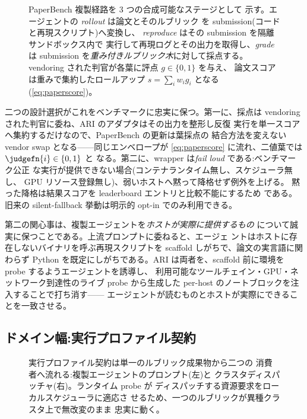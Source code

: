 \begin{figure}[t]
  \centering
  \resizebox{\textwidth}{!}{}
  \caption{PaperBench 複製経路を 3 つの合成可能なステージとして
           示す。エージェントの \emph{rollout} は論文とそのルブリック
           を submission(コードと再現スクリプト)へ変換し、
           \emph{reproduce} はその submission を隔離サンドボックス内で
           実行して再現ログとその出力を取得し、\emph{grade} は
           submission を\emph{重み付きルブリック木}に対して採点する。
           vendoring された判官が各葉に評点 $g\in\{0,1\}$ を与え、
           論文スコアは重みで集約したロールアップ $s=\sum_i w_i g_i$
           となる(\cref{eq:paperscore})。}
  \label{fig:pb-stages}
\end{figure}

二つの設計選択がこれをベンチマークに忠実に保つ。第一に、採点は
vendoring された判官に委ね、ARI のアダプタはその出力を整形し反復
実行を単一スコアへ集約するだけなので、PaperBench の更新は葉採点の
結合方法を変えない vendor swap となる——同じエンベロープが
\cref{eq:paperscore} に流れ、二値葉では $\judgefn{i}\in\{0,1\}$ と
なる。第二に、wrapper は\emph{fail loud} である:ベンチマーク公正
な実行が提供できない場合(コンテナランタイム無し、スケジューラ無し、
GPU リソース登録無し)、弱いホストへ黙って降格せず例外を上げる。
黙った降格は結果スコアを leaderboard エントリと比較不能にするため
である。旧来の silent-fallback 挙動は明示的 opt-in でのみ利用できる。

第二の関心事は、複製エージェントを\emph{ホストが実際に提供するもの}
について誠実に保つことである。上流プロンプトに委ねると、エージェ
ントはホストに存在しないバイナリを呼ぶ再現スクリプトを scaffold
しがちで、論文の実言語に関わらず Python を既定にしがちである。ARI
は両者を、scaffold 前に環境を probe するようエージェントを誘導し、
利用可能なツールチェイン・GPU・ネットワーク到達性のライブ probe
から生成した per-host のノートブロックを注入することで打ち消す——
エージェントが読むものとホストが実際にできることを一致させる。

\subsection{ドメイン幅:実行プロファイル契約}\label{sec:paper:paperbench:v072}

\begin{figure}[t]
  \centering
  \resizebox{\columnwidth}{!}{}
  \caption{実行プロファイル契約は単一のルブリック成果物から二つの
           消費者へ流れる:複製エージェントのプロンプト(左)と
           クラスタディスパッチャ(右)。ランタイム probe が
           ディスパッチする資源要求をローカルスケジューラに適応さ
           せるため、一つのルブリックが異種クラスタ上で無改変のまま
           忠実に動く。}
  \label{fig:execution-profile}
\end{figure}


